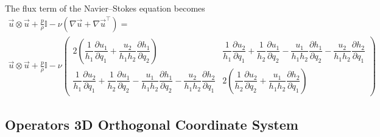 \documentclass{article}
\numberwithin{equation}{section}
\newcommand{\pd}[2]{\dfrac{\partial #1}{\partial #2}}
\begin{document}
The flux term of the Navier--Stokes equation becomes
\begin{equation}
    \begin{gathered}
        \vec{u} \otimes \vec{u} 
        + \frac{p}{\rho} \mathbb{I}
        - \nu \left(\nabla \vec{u} + \nabla \vec{u}^\top\right) = \\
        \vec{u} \otimes \vec{u} 
        + \frac{p}{\rho} \mathbb{I}
        - \nu \left(\begin{matrix}
            2 \left(\dfrac{1}{h_1} \pd{u_1}{q_1} + \dfrac{u_2}{h_1 h_2} \pd{h_1}{q_2}\right) &
            \dfrac{1}{h_1} \pd{u_2}{q_1}
            + \dfrac{1}{h_2} \pd{u_1}{q_2}
            - \dfrac{u_1}{h_1 h_2} \pd{h_1}{q_2}
            - \dfrac{u_2}{h_1 h_2} \pd{h_2}{q_1} \\
            \dfrac{1}{h_1} \pd{u_2}{q_1}
            + \dfrac{1}{h_2} \pd{u_1}{q_2}
            - \dfrac{u_1}{h_1 h_2} \pd{h_1}{q_2}
            - \dfrac{u_2}{h_1 h_2} \pd{h_2}{q_1} &
            2 \left(\dfrac{1}{h_2} \pd{u_2}{q_2} + \dfrac{u_1}{h_1 h_2} \pd{h_2}{q_1}\right)
        \end{matrix}\right)
    \end{gathered}
\end{equation}


\subsection{Operators 3D Orthogonal Coordinate System}
\end{document}
